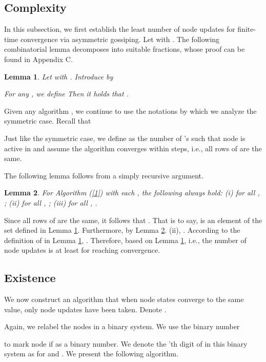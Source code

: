 \documentclass[a4paper, 11pt]{article}
\newtheorem{lemma}{Lemma}
\begin{document}
\subsection{Complexity}
In this subsection, we first establish the least number of node updates for finite-time convergence via asymmetric gossiping. Let  with .  The following combinatorial lemma  decomposes  into  suitable fractions, whose proof can be found in Appendix C.

\medskip

\begin{lemma}\label{lem3}
Let  with . Introduce  by

For any , we define
  Then it holds that  .
\end{lemma}

\medskip

Given any algorithm ,
we continue to use the notations by which we analyze the symmetric case. Recall that

Just like the symmetric case, we define
 as the number of 's such that node  is active in 
and assume the algorithm converges within  steps, i.e.,  all rows of  are the same.

The following lemma follows from a simply recursive argument.

\medskip

\begin{lemma}\label{case}
For Algorithm (\ref{1}) with each , the following always hold: (i)   for all , ; (ii)   for all , ; (iii)  for all , .
\end{lemma}

\medskip

Since all rows of  are the same, it follows that . That is to say,  is an element of the set  defined in Lemma \ref{lem3}. Furthermore, by Lemma \ref{case}. (ii), . According to the definition of  in Lemma \ref{lem3}, . Therefore,
 based on Lemma \ref{lem3}, i.e., the number of node updates is at least  for reaching convergence.




\subsection{Existence}
We now construct  an algorithm that when node states converge to the same value, only  node updates  have been taken.
Denote .

Again, we relabel the nodes in a binary system. We  use the binary number

to mark node  if  as a binary number. We denote the 'th digit of  in this binary system as  for  and . We present the following algorithm.
\end{document}
